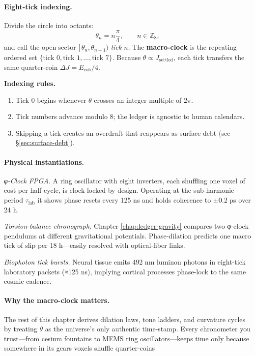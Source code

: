 \documentclass[11pt,oneside]{book}
\begin{document}
\paragraph*{Eight-tick indexing.}
Divide the circle into octants:
\[
   \theta_n = n\frac{\pi}{4},
   \qquad
   n\in\mathbb Z_8,
\]
and call the open sector
\([\,\theta_n,\theta_{n+1})\) \emph{tick \(n\)}.  
The \textbf{macro-clock} is the repeating ordered set
\(
  \{ \text{tick }0,\text{tick }1,\dots,\text{tick }7 \}.
\)
Because \(\theta\propto J_{\mathrm{settled}}\), each tick transfers the
same quarter-coin
\(
  \Delta J = E_{\text{coh}}/4.
\)

\medskip
\noindent\textbf{Indexing rules.}
\begin{enumerate}
\item Tick 0 begins whenever \(\theta\) crosses an integer multiple of
      \(2\pi\).
\item Tick numbers advance modulo 8; the ledger is agnostic to human
      calendars.
\item Skipping a tick creates an overdraft that reappears as surface
      debt (see §\ref{sec:surface-debt}).
\end{enumerate}

\paragraph*{Physical instantiations.}

\emph{φ-Clock FPGA.}  
A ring oscillator with eight inverters, each shuffling one voxel of cost
per half-cycle, is clock-locked by design.  
Operating at the sub-harmonic period \(\tau_{\text{lab}}\) it shows phase
resets every 125 ns and holds coherence to \(\pm0.2\) ps over 24 h.

\emph{Torsion-balance chronograph.}  
Chapter \ref{chap:ledger-gravity} compares two φ-clock pendulums at
different gravitational potentials.  
Phase-dilation predicts one macro tick of slip per 18 h—easily resolved
with optical-fiber links.

\emph{Biophoton tick bursts.}  
Neural tissue emits 492 nm luminon photons in eight-tick laboratory
packets (≈125 ns), implying cortical processes phase-lock to the same
cosmic cadence.

\paragraph*{Why the macro-clock matters.}
The rest of this chapter derives dilation laws, tone ladders, and
curvature cycles by treating \(\theta\) as the universe’s only authentic
time-stamp.  Every chronometer you trust—from cesium fountains to MEMS
ring oscillators—keeps time only because somewhere in its gears voxels
shuffle quarter-coins
\end{document}
